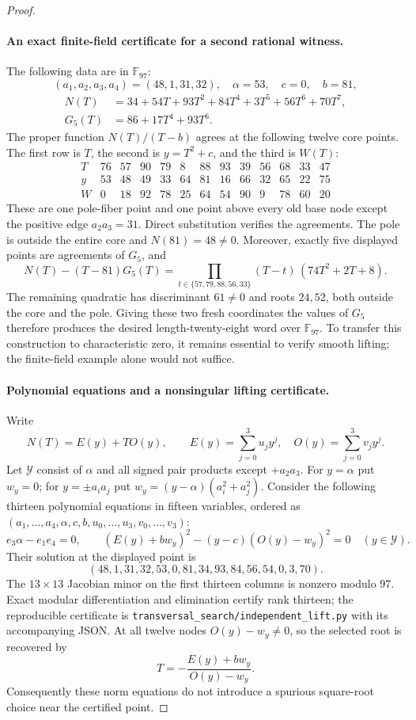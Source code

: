 \begin{proof}
\paragraph{An exact finite-field certificate for a second rational witness.}
The following data are in $\mathbb F_{97}$:
\[
 (a_1,a_2,a_3,a_4)=(48,1,31,32),\quad
 \alpha=53,\quad c=0,\quad b=81,
\]
\begin{align*}
 N(T)&=34+54T+93T^2+84T^4+3T^5+56T^6+70T^7,\\
 G_5(T)&=86+17T^4+93T^6.
\end{align*}
The proper function $N(T)/(T-b)$ agrees at the following twelve core
points.  The first row is $T$, the second is $y=T^2+c$, and the third is
$W(T)$:
\[
\begin{array}{c|rrrrrrrrrrrr}
 T&76&57&90&79&8&88&93&39&56&68&33&47\\
 y&53&48&49&33&64&81&16&66&32&65&22&75\\
 W&0&18&92&78&25&64&54&90&9&78&60&20
\end{array}
\]
These are one pole-fiber point and one point above every old base node
except the positive edge $a_2a_3=31$.  Direct substitution verifies the
agreements.  The pole is outside the entire core and $N(81)=48\ne0$.
Moreover, exactly five displayed points are agreements of $G_5$, and
\[
 N(T)-(T-81)G_5(T)
 =\prod_{t\in\{57,79,88,56,33\}}(T-t)\,
       (74T^2+2T+8).
\]
The remaining quadratic has discriminant $61\ne0$ and roots $24,52$,
both outside the core and the pole.  Giving these two fresh coordinates
the values of $G_5$ therefore produces the desired length-twenty-eight
word over $\mathbb F_{97}$.  To transfer this construction to
characteristic zero, it remains essential to verify smooth lifting;
the finite-field example alone would not suffice.

\paragraph{Polynomial equations and a nonsingular lifting certificate.}
Write
\[
 N(T)=E(y)+T O(y),\qquad
 E(y)=\sum_{j=0}^3 u_jy^j,\quad O(y)=\sum_{j=0}^3 v_jy^j.
\]
Let $\mathcal Y$ consist of $\alpha$ and all signed pair products except
$+a_2a_3$.  For $y=\alpha$ put $w_y=0$; for
$y=\pm a_i a_j$ put $w_y=(y-\alpha)(a_i^2+a_j^2)$.
Consider the following thirteen polynomial equations in fifteen variables,
ordered as $(a_1,\ldots,a_4,\alpha,c,b,u_0,\ldots,u_3,v_0,\ldots,v_3)$:
\begin{equation}\label{eq:six-word-norm-system}
 e_3\alpha-e_1e_4=0,\qquad
 (E(y)+b w_y)^2-(y-c)(O(y)-w_y)^2=0
       \quad(y\in\mathcal Y).
\end{equation}
Their solution at the displayed point is
\[
 (48,1,31,32,53,0,81,34,93,84,56,54,0,3,70).
\]
The $13\times13$ Jacobian minor on the first thirteen columns is nonzero
modulo $97$.  Exact modular differentiation and elimination certify rank
thirteen; the reproducible certificate is
\texttt{transversal\_search/independent\_lift.py} with its accompanying JSON.
At all twelve nodes $O(y)-w_y\ne0$, so the selected root is recovered by
\[
 T=-\frac{E(y)+b w_y}{O(y)-w_y}.
\]
Consequently these norm equations do not introduce a spurious square-root
choice near the certified point.


\end{proof}

